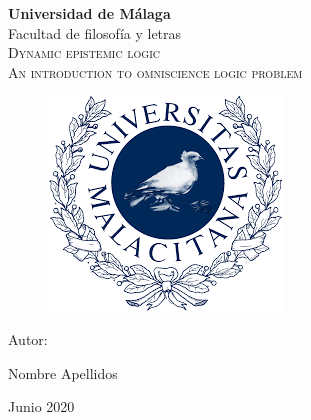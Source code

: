 \documentclass[a4paper]{book}
\begin{document}
\begin{titlepage}
	\centering
	{\LARGE \textbf{Universidad de Málaga}} \\
	\vspace{0.5cm}
	{\Large Facultad de filosofía y letras} \\
	\vspace{2cm}
	\hline
	\vspace{1cm}
	{\Huge  \textsc{Dynamic epistemic logic}}\\
	\vspace{0.5cm}
	{\Large \textsc{An introduction to  omniscience logic problem}}
	\vspace{1cm}
	\hline
	\vspace{1cm}
	\begin{figure}[!h]
		\centering
		\includegraphics[scale=0.5]{index.png}
	\end{figure}
	\vfill
	{\Large Autor: \par}
	{\Large Nombre Apellidos \par}
	\vfill
	{\Large Junio 2020 \par}

\end{titlepage}
\end{document}
